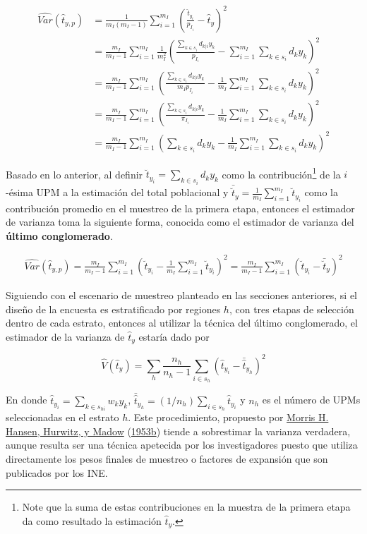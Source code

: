 \documentclass[
  12pt,
  spanish,
]{book}
\begin{document}
\begin{align*}
\widehat{Var}(\hat{t}_{y,p})&=\frac{1}{m_I(m_I-1)}\sum_{i=1}^{m_I}\left(\frac{\hat{t}_{y_i}}{p_{I_i}}-\hat{t}_{y}\right)^2\\
&=\frac{m_I}{m_I-1}\sum_{i=1}^{m_I}\frac{1}{m_I^2}\left(\frac{\sum_{k \in s_i} d_{k|i} y_k }{p_{I_i}}-\sum_{i=1}^{m_I}\sum_{k \in s_i} d_k y_k \right)^2 \\
&=\frac{m_I}{m_I-1}\sum_{i=1}^{m_I}\left(\frac{\sum_{k \in s_i} d_{k|i} y_k }{m_I p_{I_i}}-\frac{1}{m_I}\sum_{i=1}^{m_I}\sum_{k \in s_i} d_k y_k \right)^2 \\
&=\frac{m_I}{m_I-1}\sum_{i=1}^{m_I}\left(\frac{\sum_{k \in s_i} d_{k|i} y_k }{\pi_{I_i}}-\frac{1}{m_I}\sum_{i=1}^{m_I}\sum_{k \in s_i} d_k y_k \right)^2 \\
&=\frac{m_I}{m_I-1}\sum_{i=1}^{m_I}\left( \sum_{k \in s_i} d_k y_k -\frac{1}{m_I}\sum_{i=1}^{m_I}\sum_{k \in s_i} d_k y_k \right)^2 
\end{align*}

Basado en lo anterior, al definir \(\breve{t}_{y_i} = \sum_{k \in s_i} d_k y_k\) como la contribución\footnote{Note que la suma de estas contribuciones en la muestra de la primera etapa da como resultado la estimación \(\hat{t}_y\).} de la \(i\)-ésima UPM a la estimación del total poblacional y \(\bar{\breve{t}}_{y}=\frac{1}{m_I}\sum_{i=1}^{m_I}\breve{t}_{y_i}\) como la contribución promedio en el muestreo de la primera etapa, entonces el estimador de varianza toma la siguiente forma, conocida como el estimador de varianza del \textbf{último conglomerado}.

\begin{align}
\label{UC}
\widehat{Var}(\hat{t}_{y,p})
=\frac{m_I}{m_I-1}\sum_{i=1}^{m_I}\left( \breve{t}_{y_i} -\frac{1}{m_I}\sum_{i=1}^{m_I}\breve{t}_{y_i} \right)^2 
=\frac{m_I}{m_I-1}\sum_{i=1}^{m_I}\left( \breve{t}_{y_i} - \bar{\breve{t}}_{y} \right)^2
\end{align}

Siguiendo con el escenario de muestreo planteado en las secciones anteriores, si el diseño de la encuesta es estratificado por regiones \(h\), con tres etapas de selección dentro de cada estrato, entonces al utilizar la técnica del último conglomerado, el estimador de la varianza de \(\hat{t}_{y}\) estaría dado por

\[
\hat{V}(\hat{t}_{y}) = 
\sum_h\frac{n_h}{n_h-1}\sum_{i\in s_h}\left(\hat{t}_{y_i}-\bar{\hat{t}}_{y_h}\right)^2
\]

En donde \(\hat{t}_{y_i} = \sum_{k \in s_{hi}} w_k y_k\), \(\bar{\hat{t}}_{y_h}=(1/n_h)\sum_{i \in s_h}\hat{t}_{y_i}\) y \(n_h\) es el número de UPMs seleccionadas en el estrato \(h\). Este procedimiento, propuesto por \protect\hyperlink{ref-hansen1953sample}{Morris H. Hansen, Hurwitz, y Madow} (\protect\hyperlink{ref-hansen1953sample}{1953b}) tiende a sobrestimar la varianza verdadera, aunque resulta ser una técnica apetecida por los investigadores puesto que utiliza directamente los pesos finales de muestreo o factores de expansión que son publicados por los INE.
\end{document}
